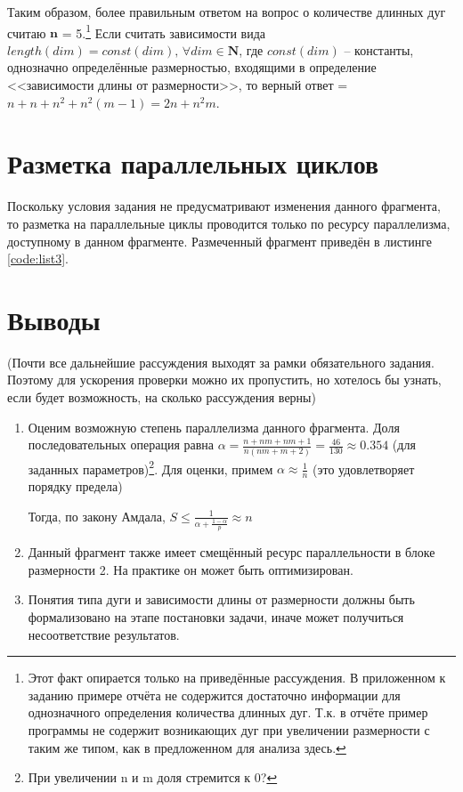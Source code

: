 \documentclass[12pt, fleqn]{article}
\theoremstyle{definition}
\newenvironment{packed_enum}{
\begin{enumerate}
  \setlength{\itemsep}{1pt}
  \setlength{\parskip}{0pt}
  \setlength{\parsep}{0pt}
}{\end{enumerate}}
\begin{document}
\begin{packed_enum}
Таким образом, более правильным ответом на вопрос о количестве длинных дуг считаю $\mathbf{n}$ = 5.\footnote{Этот факт опирается только на приведённые рассуждения. В приложенном к заданию примере отчёта не содержится достаточно информации для однозначного определения количества длинных дуг. Т.к. в отчёте пример программы не содержит возникающих дуг при увеличении размерности с таким же типом, как в предложенном для анализа здесь.}
Если считать зависимости вида $length(dim) = const(dim), \, \forall dim \in \mathbf{N}$, где $const(dim)$ -- константы, однозначно определённые размерностью, входящими в определение <<зависимости длины от размерности>>, то верный ответ = $n + n + n^2 + n^2 (m - 1) = 2n + n^2m$.
\end{packed_enum}

\section{Разметка параллельных циклов}
Поскольку условия задания не предусматривают изменения данного фрагмента, то разметка на параллельные циклы проводится только по ресурсу параллелизма, доступному в данном фрагменте.
Размеченный фрагмент приведён в листинге \ref{code:list3}.
{}
\section{Выводы}
(Почти все дальнейшие рассуждения выходят за рамки обязательного задания. Поэтому для ускорения проверки можно их пропустить, но хотелось бы узнать, если будет возможность, на сколько рассуждения верны)
\begin{enumerate}
 \item Оценим возможную степень параллелизма данного фрагмента. Доля последовательных операция равна $\alpha = \frac{n + nm + nm + 1}{n(nm + m + 2)} = \frac{46}{130} \approx 0.354$ (для заданных параметров)\footnote{При увеличении n и m доля стремится к 0?}. Для оценки, примем $\alpha \approx \frac{1}{n}$ (это удовлетворяет порядку предела)
 
 Тогда, по закону Амдала, $S \leq \frac{1}{\alpha + \frac{1-\alpha}{p}} \approx n$
 \item Данный фрагмент также имеет смещённый ресурс параллельности в блоке размерности 2. На практике он может быть оптимизирован.
 \item Понятия типа дуги и зависимости длины от размерности должны быть формализовано на этапе постановки задачи, иначе может получиться несоответствие результатов.
\end{enumerate}
\end{document}
